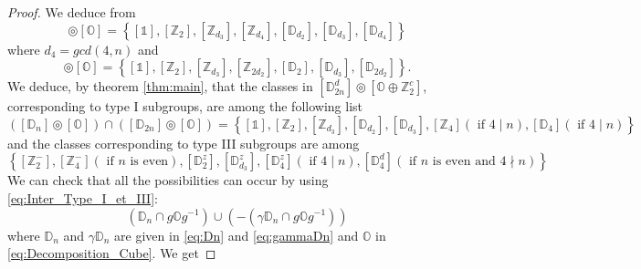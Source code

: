 \documentclass[11pt,a4paper]{amsart}
\theoremstyle{definition}
\newcommand{\ZZ}{\mathbb{Z}}                %
\newcommand{\octa}{\mathbb{O}}              %
\newcommand{\DD}{\mathbb{D}}                %
\newcommand{\1}{\mathds{1}}		            %
\newcommand{\set}[1]{\left\{#1\right\}}     %
\begin{document}
 \begin{proof}
 	We deduce from \cite[table 1]{Olive2019}
 	\begin{equation*}
 	[\DD_n]\circledcirc [\octa]=\set{[\1],[\ZZ_2],[\ZZ_{d_3}],[\ZZ_{d_4}],[\DD_{d_2}],[\DD_{d_3}],[\DD_{d_4}]}
 	\end{equation*} 
 	where $d_4=gcd(4,n)$ and 
 	\begin{equation*}
 	[\DD_{2n}]\circledcirc[\octa]=\set{[\1],[\ZZ_2],[\ZZ_{d_3}],[\ZZ_{2d_2}],[\DD_2],[\DD_{d_3}],[\DD_{2d_2}]}.
 	\end{equation*}
 	We deduce, by theorem \ref{thm:main}, that the classes in $[\DD_{2n}^d]\circledcirc [\octa\oplus \ZZ_2^c]$, corresponding to type I subgroups, are among the following list
 \begin{equation*}
 ([\DD_n]\circledcirc [\octa])\cap ([\DD_{2n}]\circledcirc[\octa])=\set{[\1],[\ZZ_{2}],[\ZZ_{d_3}],[\DD_{d_2}],[\DD_{d_3}],[\ZZ_4](\text{ if $4\mid n$}),[\DD_4](\text{ if $4\mid n$})}
 \end{equation*}
 and the classes corresponding to type III subgroups are among
 \begin{equation*}
 \set{[\ZZ_2^-],[\ZZ_4^-](\text{ if $n$ is even}),[\DD_{2}^z],[\DD_{d_3}^z],[\DD_4^z](\text{ if $4\mid n$}),[\DD_4^d](\text{ if $n$ is even and $4\nmid n$})}.
 \end{equation*}
 We can check that all the possibilities can occur by using \eqref{eq:Inter_Type_I_et_III}:
 \begin{equation*}
 (\DD_n\cap g \octa g^{-1})\cup (-(\gamma\DD_n\cap g \octa g^{-1}))
 \end{equation*}
 where  $\DD_n$ and $ \gamma\DD_n$ are given in \eqref{eq:Dn} and \eqref{eq:gammaDn} and $\octa$ in \eqref{eq:Decomposition_Cube}.
 We get


\end{proof}
\end{document}
